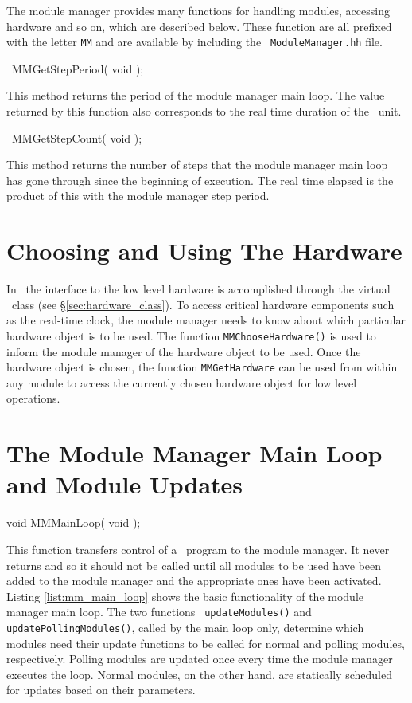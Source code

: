 The module manager provides many functions for handling modules, accessing
hardware and so on, which are described below. These function are all
prefixed with the letter {\tt MM} and are available by including the {\tt
ModuleManager.hh} file.

\begin{prototype}
\CLOCK\ MMGetStepPeriod( void );
\end{prototype}

This method returns the period of the module manager main loop. The value
returned by this function also corresponds to the real time duration of the
\mmstep\ unit.

\begin{prototype}
\mmstep\ MMGetStepCount( void );
\end{prototype}

This method returns the number of steps that the module manager main loop
has gone through since the beginning of execution. The real time elapsed is
the product of this with the module manager step period.

\section{Choosing and Using The Hardware}
\label{sec:choosing_hardware}

In \rhexlib\, the interface to the low level hardware is accomplished
through the virtual \Hardware\ class (see \S\ref{sec:hardware_class}). To
access critical hardware components such as the real-time clock, the module
manager needs to know about which particular hardware object is to be
used. The function {\tt MMChooseHardware()} is used to inform the module
manager of the hardware object to be used. Once the hardware object is
chosen, the function {\tt MMGetHardware} can be used from within any module
to access the currently chosen hardware object for low level operations.

\section{The Module Manager Main Loop and Module Updates}
\label{sec:mm_main_loop}

\begin{prototype}
void MMMainLoop( void );
\end{prototype}

This function transfers control of a \rhexlib\ program to the module
manager. It never returns and so it should not be called until all modules
to be used have been added to the module manager and the appropriate ones
have been activated. Listing \ref{list:mm_main_loop} shows the basic
functionality of the module manager main loop. The two functions {\tt
updateModules()} and {\tt updatePollingModules()}, called by the main loop
only, determine which modules need their update functions to be called for
normal and polling modules, respectively. Polling modules are updated once
every time the module manager executes the loop. Normal modules, on the
other hand, are statically scheduled for updates based on their parameters.

